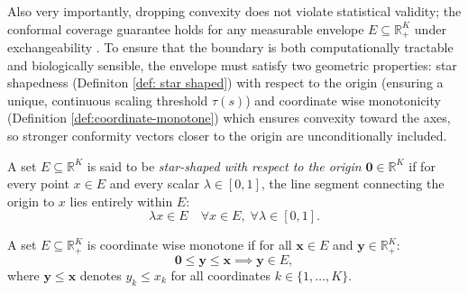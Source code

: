
Also very importantly, dropping convexity does not violate statistical validity; the conformal coverage guarantee holds for 
any measurable envelope $E \subseteq \mathbb{R}_+^K$ under exchangeability \cite{ochoarivera2024conformal}. 
To ensure that the boundary is both computationally tractable and biologically sensible, the envelope must satisfy two 
geometric properties: star shapedness (Definiton \ref{def: star shaped}) with respect to the origin (ensuring a unique, 
continuous scaling threshold $\tau(s)$) and coordinate wise monotonicity (Definition \ref{def:coordinate-monotone}) which 
ensures convexity toward the axes, so stronger conformity vectors closer to the origin are 
unconditionally included.

\begin{definition}
\label{def: star shaped}
A set $E \subseteq \mathbb{R}^K$ is said to be \emph{star-shaped with respect to the origin} $\textbf{0} \in \mathbb{R}^K$ if 
for every point $x \in E$ and every scalar $\lambda \in [0, 1]$, the line segment connecting the origin to $x$ lies entirely 
within $E$:
$$\lambda x \in E \quad \forall x \in E, \; \forall \lambda \in [0, 1].$$
\end{definition}


\begin{definition}
\label{def:coordinate-monotone}
A set $E \subseteq \mathbb{R}_+^K$ is coordinate wise monotone if for all $\mathbf{x} \in E$ and $\mathbf{y} \in 
\mathbb{R}_+^K$:
\begin{equation*}
\mathbf{0} \le \mathbf{y} \le \mathbf{x} \implies \mathbf{y} \in E,
\end{equation*}
where $\mathbf{y} \le \mathbf{x}$ denotes $y_k \le x_k$ for all coordinates $k \in \{1, \dots, K\}$.
\end{definition}





